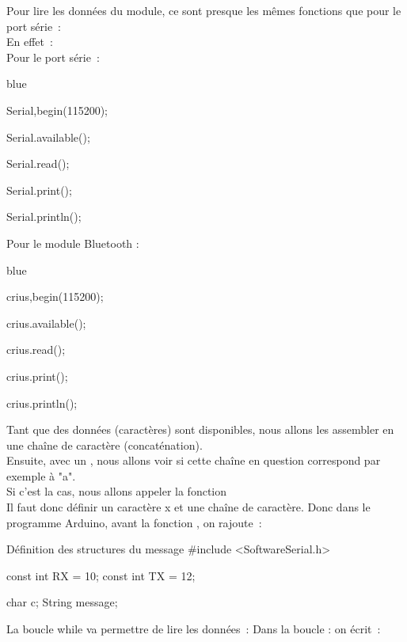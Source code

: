 Pour lire les données du module, ce sont presque les mêmes fonctions que pour le port série : \\
En effet : \\

Pour le port série :	\\	

\begin{items}{blue}{\Triangle}
    \item Serial,begin(115200);
    \item Serial.available();
    \item Serial.read();	
    \item Serial.print();
    \item Serial.println();
\end{items}

Pour le module Bluetooth : \\

\begin{items}{blue}{\Triangle}
    \item crius,begin(115200);
    \item crius.available();
    \item crius.read();	
    \item crius.print();
    \item crius.println();
    
\end{items}


Tant que des données (caractères) sont disponibles, nous allons les assembler en une chaîne de caractère (concaténation). \\
Ensuite, avec un , nous allons voir si cette chaîne en question correspond par exemple à "a". \\ 
Si c'est la cas, nous allons appeler la fonction  \\

Il faut donc définir un caractère x et une chaîne de caractère.
Donc dans le programme Arduino, avant la fonction , on rajoute :

\begin{Cpp}{Définition des structures du message}
#include <SoftwareSerial.h>

const int RX = 10;
const int TX = 12;

char c;
String message;

\end{Cpp}

La boucle while va permettre de lire les données : 
Dans la boucle  : on écrit :

